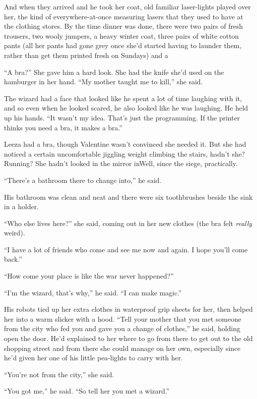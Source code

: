 And when they arrived and he took her coat, old familiar
laser-lights played over her, the kind of every\-where-at-once
measuring lasers that they used to have at the clothing stores. By
the time dinner was done, there were two pairs of fresh trousers,
two wooly jumpers, a heavy winter coat, three pairs of white cotton
pants (all her pants had gone grey once she’d started having to
launder them, rather than get them printed fresh on Sundays) and
a\dash{}

“A bra?” She gave him a hard look. She had the knife she’d used on
the hamburger in her hand. “My mother taught me to kill,” she
said.

The wizard had a face that looked like he spent a lot of time
laughing with it, and so even when he looked scared, he also looked
like he was laughing. He held up his hands. “It wasn’t my idea.
That’s just the programming. If the printer thinks you need a bra,
it makes a bra.”

Leeza had a bra, though Valentine wasn’t convinced she needed it.
But she had noticed a certain uncomfortable jiggling weight
climbing the stairs, hadn’t she? Running? She hadn’t looked in the
mirror in\dash{}Well, since the siege, practically.

“There’s a bathroom there to change into,” he said.

His bathroom was clean and neat and there were six toothbrushes
beside the sink in a holder.

“Who else lives here?” she said, coming out in her new clothes (the
bra felt \emph{really} weird).

“I have a lot of friends who come and see me now and again. I hope
you’ll come back.”

“How come your place is like the war never happened?”

“I’m the wizard, that’s why,” he said. “I can make magic.”

His robots tied up her extra clothes in waterproof grip sheets for
her, then helped her into a warm slicker with a hood. “Tell your
mother that you met someone from the city who fed you and gave you
a change of clothes,” he said, holding open the door. He’d
explained to her where to go from there to get out to the old
shopping street and from there she could manage on her own,
especially since he’d given her one of his little pea-lights to
carry with her.

“You’re not from the city,” she said.

“You got me,” he said. “So tell her you met a wizard.”

